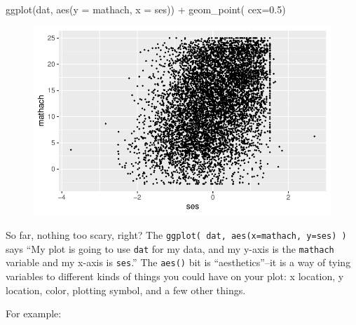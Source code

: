 \documentclass[
  letterpaper,
  DIV=11,
  numbers=noendperiod]{scrreprt}
\newenvironment{Shaded}{\begin{snugshade}}{\end{snugshade}}
\newcommand{\AttributeTok}[1]{\textcolor[rgb]{0.49,0.56,0.16}{#1}}
\newcommand{\FloatTok}[1]{\textcolor[rgb]{0.25,0.63,0.44}{#1}}
\newcommand{\FunctionTok}[1]{\textcolor[rgb]{0.02,0.16,0.49}{#1}}
\newcommand{\NormalTok}[1]{\textcolor[rgb]{0.00,0.44,0.13}{#1}}
\newcommand{\SpecialCharTok}[1]{\textcolor[rgb]{0.25,0.44,0.63}{#1}}
\begin{document}
\begin{Shaded}
\begin{Highlighting}[]
\FunctionTok{ggplot}\NormalTok{(dat, }\FunctionTok{aes}\NormalTok{(}\AttributeTok{y =}\NormalTok{ mathach, }\AttributeTok{x =}\NormalTok{ ses)) }\SpecialCharTok{+} 
  \FunctionTok{geom\_point}\NormalTok{( }\AttributeTok{cex=}\FloatTok{0.5}\NormalTok{)}
\end{Highlighting}
\end{Shaded}

\begin{figure}[H]

{\centering \includegraphics{intro_ggplot_files/figure-pdf/unnamed-chunk-2-1.pdf}

}

\end{figure}

So far, nothing too scary, right? The
\texttt{ggplot(\ dat,\ aes(x=mathach,\ y=ses)\ )} says ``My plot is
going to use \texttt{dat} for my data, and my y-axis is the
\texttt{mathach} variable and my x-axis is \texttt{ses}.'' The
\texttt{aes()} bit is ``aesthetics''--it is a way of tying variables to
different kinds of things you could have on your plot: x location, y
location, color, plotting symbol, and a few other things.

For example:
\end{document}
